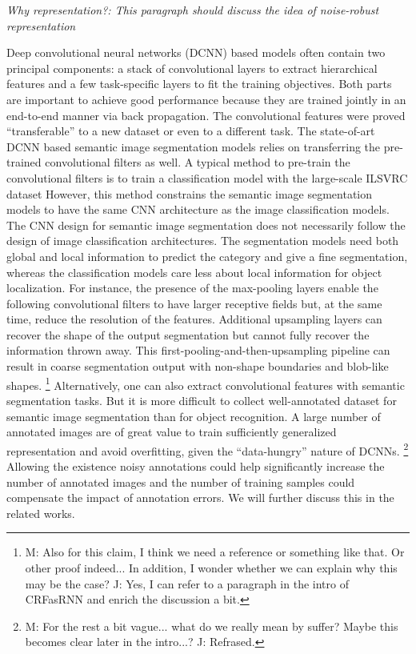\noindent
\textit{Why representation?: This paragraph should discuss the idea of noise-robust representation}

\noindent
Deep convolutional neural networks (DCNN) based models often contain two principal components: a stack of convolutional layers to extract hierarchical features and a few task-specific layers to fit the training objectives.
Both parts are important to achieve good performance because they are trained jointly in an end-to-end manner via back propagation.
The convolutional features were proved ``transferable'' to a new dataset\cite{yosinski2014transferable} or even to a different task\cite{girshick2014rich}.
The state-of-art DCNN based semantic image segmentation models relies on transferring the pre-trained convolutional filters as well.\cite{long2015fully}
A typical method to pre-train the convolutional filters is to train a classification model with the large-scale ILSVRC dataset \cite{russakovsky2015imagenet}
However, this method constrains the semantic image segmentation models to have the same CNN architecture as the image classification models.
The CNN design for semantic image segmentation does not necessarily follow the design of image classification architectures.
The segmentation models need both global and local information to predict the category and give a fine segmentation, whereas the classification models care less about local information for object localization.
For instance, the presence of the max-pooling layers enable the following convolutional filters to have larger receptive fields but, at the same time, reduce the resolution of the features.
Additional upsampling layers can recover the shape of the output segmentation but cannot fully recover the information thrown away.
This first-pooling-and-then-upsampling pipeline can result in coarse segmentation output \cite{chen2016deeplab} with non-shape boundaries and blob-like shapes.
\footnote{M: Also for this claim, I think we need a reference or something like that. Or other proof indeed...  In addition, I wonder whether we can explain why this may be the case? J: Yes, I can refer to a paragraph in the intro of CRFasRNN and enrich the discussion a bit.}
\noindent
Alternatively, one can also extract convolutional features with semantic segmentation tasks.
But it is more difficult to collect well-annotated dataset for semantic image segmentation than for object recognition.
A large number of annotated images are of great value to train sufficiently generalized representation and avoid overfitting, given the ``data-hungry'' nature of DCNNs.
\footnote{M: For the rest a bit vague... what do we really mean by suffer? Maybe this becomes clear later in the intro...? J: Refrased.}
Allowing the existence noisy annotations could help significantly increase the number of annotated images and the number of training samples could compensate the impact of annotation errors.
We will further discuss this in the related works.

